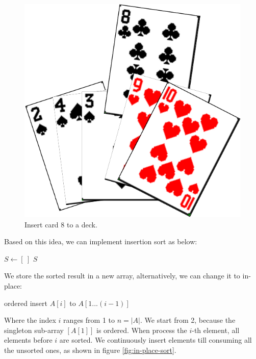 \documentclass[b5paper]{article}
\begin{document}
\begin{figure}[htbp]
  \centering
  \includegraphics[scale=0.5]{img/card-deck}
  \caption{Insert card 8 to a deck.}
  \label{fig:hand-of-cards}
\end{figure}

Based on this idea, we can implement insertion sort as below:

\begin{algorithmic}[1]
  \State $S \gets [\ ]$
    \State {}
  \EndFor
  \State \Return $S$
\EndFunction
\end{algorithmic}

We store the sorted result in a new array, alternatively, we can change it to in-place:

\begin{algorithmic}[1]
    \State ordered insert $A[i]$ to $A[1...(i-1)]$
  \EndFor
\EndFunction
\end{algorithmic}

Where the index $i$ ranges from 1 to $n = |A|$. We start from 2, because the singleton sub-array $[A[1]]$ is ordered. When process the $i$-th element, all elements before $i$ are sorted. We continuously insert elements till consuming all the unsorted ones, as shown in figure \ref{fig:in-place-sort}.
\end{document}
